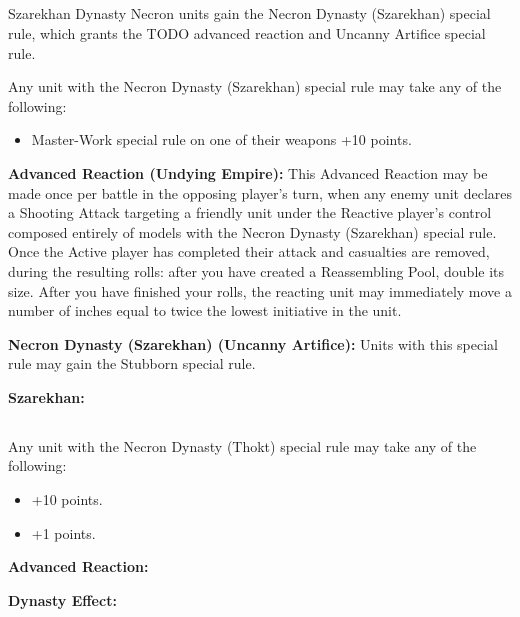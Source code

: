 \newpage
\subsection[Szarekhan]{}

Szarekhan Dynasty Necron units gain the Necron Dynasty (Szarekhan) special rule, which grants the TODO advanced reaction and Uncanny Artifice special rule.

Any unit with the Necron Dynasty (Szarekhan) special rule may take any of the following:
\begin{itemize}
	\item Master-Work special rule on one of their weapons \dotfill +10 points.
\end{itemize}

\textbf{Advanced Reaction (Undying Empire):} This Advanced Reaction may be made once per battle in the opposing player's turn, when any enemy unit declares a Shooting Attack targeting a friendly unit under the Reactive player's control composed entirely of models with the Necron Dynasty (Szarekhan) special rule. Once the Active player has completed their attack and casualties are removed, during the resulting  rolls: after you have created a Reassembling Pool, double its size. After you have finished your  rolls, the reacting unit may immediately move a number of inches equal to twice the lowest initiative in the unit.

\textbf{Necron Dynasty (Szarekhan) (Uncanny Artifice):} Units with this special rule may gain the Stubborn special rule. %

\textbf{Szarekhan:}


\newpage
\subsection[Thokt]{}

Any unit with the Necron Dynasty (Thokt) special rule may take any of the following:
\begin{itemize}
	\item {} \dotfill +10 points.
	\item {} \dotfill +1 points.
\end{itemize}

\textbf{Advanced Reaction:}

\textbf{Dynasty Effect:} 

